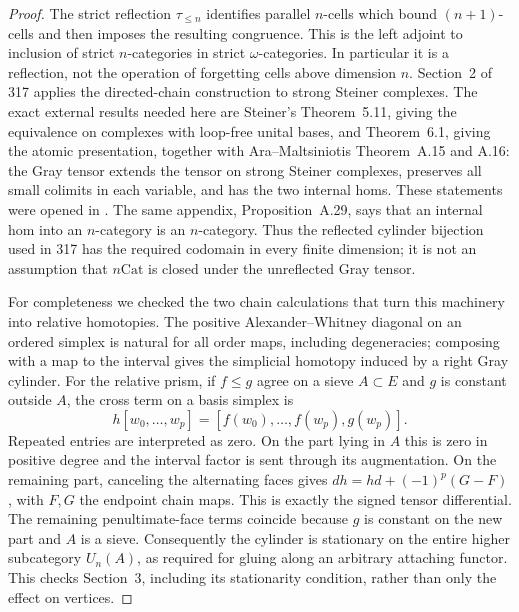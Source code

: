 \begin{proof}
The strict reflection $\tau_{\leq n}$ identifies parallel $n$-cells
which bound $(n+1)$-cells and then imposes the resulting congruence.
This is the left adjoint to inclusion of strict $n$-categories in
strict $\omega$-categories. In particular it is a reflection, not
the operation of forgetting cells above dimension $n$.
Section~2 of 317 applies the directed-chain construction to
strong Steiner complexes. The exact external results needed here
are Steiner's Theorem~5.11, giving the equivalence on complexes with
loop-free unital bases, and Theorem~6.1, giving the atomic
presentation, together with Ara--Maltsiniotis Theorem~A.15 and
A.16: the Gray tensor extends the tensor on strong Steiner complexes,
preserves all small colimits in each variable, and has the two
internal homs. These statements were opened in
\cite{I_Steiner2004,I_AraMaltsiniotis2020}. The same appendix,
Proposition~A.29, says that an internal hom into an $n$-category is
an $n$-category. Thus the reflected cylinder bijection used in 317
has the required codomain in every finite dimension; it is not an
assumption that $n\mathrm{Cat}$ is closed under the unreflected
Gray tensor.

For completeness we checked the two chain calculations that turn
this machinery into relative homotopies. The positive
Alexander--Whitney diagonal on an ordered simplex is natural for
all order maps, including degeneracies; composing with a map to
the interval gives the simplicial homotopy induced by a right Gray
cylinder. For the relative prism, if $f\leq g$ agree on a sieve
$A\subset E$ and $g$ is constant outside $A$, the cross term on
a basis simplex is
\[
 h[w_0,\ldots,w_p]
   =[f(w_0),\ldots,f(w_p),g(w_p)].
\]
Repeated entries are interpreted as zero. On the part lying in $A$
this is zero in positive degree and the interval factor is sent
through its augmentation. On the remaining part, canceling the
alternating faces gives
$dh=hd+(-1)^p(G-F)$, with $F,G$ the endpoint chain maps.
This is exactly the signed tensor differential. The remaining
penultimate-face terms coincide because $g$ is constant on the
new part and $A$ is a sieve. Consequently the cylinder is stationary
on the entire higher subcategory $U_n(A)$, as required for gluing
along an arbitrary attaching functor. This checks Section~3,
including its stationarity condition, rather than only the effect
on vertices.


\end{proof}
